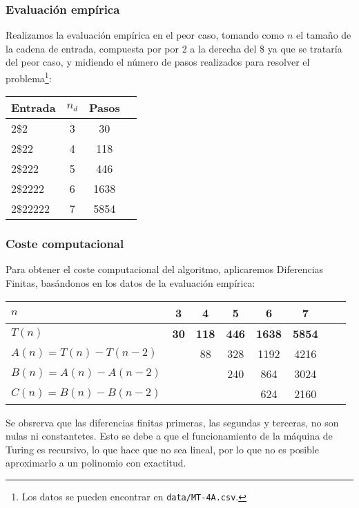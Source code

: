 \subsubsection*{Evaluación empírica}
Realizamos la evaluación empírica en el peor caso, tomando como $n$ el tamaño de la cadena de entrada, compuesta por por 2 a la derecha del \$ ya que se trataría del peor caso, y midiendo el número de pasos realizados para resolver el problema\footnote{Los datos se pueden encontrar en \texttt{data/MT-4A.csv}.}:


\begin{table}[h]
    \centering
    \begin{tabular}{lccc}
        Entrada & $n_d$ & Pasos \\
        \hline
        2\$2                     & 3  & 30   \\
        2\$22                    & 4  & 118   \\
        2\$222                   & 5  & 446  \\
        2\$2222                  & 6  & 1638  \\
        2\$22222                 & 7  & 5854  \\
    \end{tabular}
\end{table}


\subsubsection*{Coste computacional}
Para obtener el coste computacional del algoritmo, aplicaremos Diferencias Finitas, basándonos en los datos de la evaluación empírica:


\begin{table}[h]
    \centering
    \begin{tabular}{|l|c|c|c|c|c|c|c|}
        \hline
        $n$ & \textbf{3} & \textbf{4} & \textbf{5} & \textbf{6} & \textbf{7}\\ \hline
        $T(n)$ & \textbf{30} & \textbf{118} & \textbf{446} & \textbf{1638} & \textbf{5854}      \\ \hline
        \hline
        $A(n) = T(n) - T(n-2)$ &    & 88 & 328 & 1192 & 4216 \\ \hline
        $B(n) = A(n) - A(n-2)$ &    &   & 240 & 864 & 3024 \\ \hline
        $C(n) = B(n) - B(n-2)$ &    &   &    & 624 & 2160 \\ \hline
    \end{tabular}
\end{table}

Se obsrerva que las diferencias finitas primeras, las segundas y terceras, no son nulas ni constantetes. Esto se debe a que el funcionamiento de la máquina de Turing es recursivo, lo que hace que no sea lineal, por lo que no es posible aproximarlo a un polinomio con exactitud.\\
